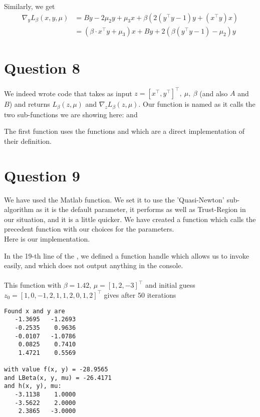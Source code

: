\documentclass{article}
\newcommand{\tp}{^\top}
\begin{document}
Similarly, we get
\begin{align*}
\nabla_y L_\beta(x,y,\mu)&=By - 2\mu_2 y+\mu_3 x+\beta \left( 2(y\tp y-1)  y+(x\tp y ) x \right) \\
&=(\beta \cdot x\tp y + \mu_3)x+ By + 2(\beta (y\tp y-1) - \mu_2) y
\end{align*}


\section*{Question 8}

We indeed wrote code that takes as input $z = [x\tp, y\tp]\tp,\ \mu,\ \beta$ (and also $A$ and $B$) and returns $L_\beta(z, \mu)$ and $\nabla_z L_\beta(z, \mu)$.
Our function is named  as it calls the two sub-functions we are showing here:  and 






The first function uses the functions  and  which are a direct implementation of their definition.

\section*{Question 9}

We have used the Matlab  function. We set it to use the 'Quasi-Newton' sub-algorithm as it is the default parameter, it performs as well as Trust-Region in our situation, and it is a little quicker.
We have created a function  which calls the precedent function with our choices for the parameters.\\
Here is our implementation.



In the 19-th line of the , we defined a function handle which allows us to invoke  easily, and which does not output anything in the console.\\
\\
This function with $\beta = 1.42$, $\mu = [1, 2, -3]\tp$ and initial guess $z_0 = [1, 0, -1, 2, 1, 1, 2, 0, 1, 2]\tp$  gives after 50 iterations
\begin{lstlisting}
Found x and y are
   -1.3695   -1.2693
   -0.2535    0.9636
   -0.0107   -1.0786
    0.0825    0.7410
    1.4721    0.5569

with value f(x, y) = -28.9565
and LBeta(x, y, mu) = -26.4171
and h(x, y), mu:
   -3.1138    1.0000
   -3.5622    2.0000
    2.3865   -3.0000
\end{lstlisting}
\end{document}
